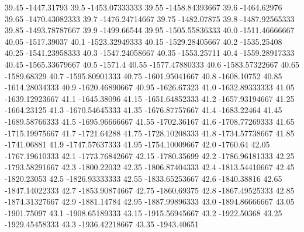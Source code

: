           39.45      -1447.31793
           39.5   -1453.07333333
          39.55   -1458.84393667
           39.6      -1464.62976
          39.65   -1470.43082333
           39.7   -1476.24714667
          39.75      -1482.07875
           39.8   -1487.92565333
          39.85   -1493.78787667
           39.9      -1499.66544
          39.95   -1505.55836333
           40.0   -1511.46666667
          40.05      -1517.39037
           40.1   -1523.32949333
          40.15   -1529.28405667
           40.2      -1535.25408
          40.25   -1541.23958333
           40.3   -1547.24058667
          40.35      -1553.25711
           40.4   -1559.28917333
          40.45   -1565.33679667
           40.5          -1571.4
          40.55   -1577.47880333
           40.6   -1583.57322667
          40.65      -1589.68329
           40.7   -1595.80901333
          40.75   -1601.95041667
           40.8      -1608.10752
          40.85   -1614.28034333
           40.9   -1620.46890667
          40.95      -1626.67323
           41.0   -1632.89333333
          41.05   -1639.12923667
           41.1      -1645.38096
          41.15   -1651.64852333
           41.2   -1657.93194667
          41.25      -1664.23125
           41.3   -1670.54645333
          41.35   -1676.87757667
           41.4      -1683.22464
          41.45   -1689.58766333
           41.5   -1695.96666667
          41.55      -1702.36167
           41.6   -1708.77269333
          41.65   -1715.19975667
           41.7      -1721.64288
          41.75   -1728.10208333
           41.8   -1734.57738667
          41.85      -1741.06881
           41.9   -1747.57637333
          41.95   -1754.10009667
           42.0         -1760.64
          42.05   -1767.19610333
           42.1   -1773.76842667
          42.15      -1780.35699
           42.2   -1786.96181333
          42.25   -1793.58291667
           42.3      -1800.22032
          42.35   -1806.87404333
           42.4   -1813.54410667
          42.45      -1820.23053
           42.5   -1826.93333333
          42.55   -1833.65253667
           42.6      -1840.38816
          42.65   -1847.14022333
           42.7   -1853.90874667
          42.75      -1860.69375
           42.8   -1867.49525333
          42.85   -1874.31327667
           42.9      -1881.14784
          42.95   -1887.99896333
           43.0   -1894.86666667
          43.05      -1901.75097
           43.1   -1908.65189333
          43.15   -1915.56945667
           43.2      -1922.50368
          43.25   -1929.45458333
           43.3   -1936.42218667
          43.35      -1943.40651
